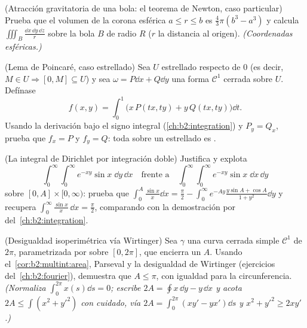 \begin{exercise}[$\star\star$]\label{exo:b2:multint:7}
(Atracción gravitatoria de una bola: el teorema de Newton, caso
particular) Prueba que el volumen de la corona esférica $a \leq r
\leq b$ es $\frac43\pi(b^3 - a^3)$ y calcula $\iiint_{B} \frac{\dd
x\,\dd y\,\dd z}{r}$ sobre la bola $B$ de radio $R$ ($r$ la distancia
al origen). \emph{(Coordenadas esféricas.)}
\end{exercise}

\begin{exercise}[$\star\star\star$]\label{exo:b2:multint:8}
(Lema de Poincaré, caso estrellado) Sea $U$ estrellado respecto de
$0$ (es decir, $M \in U \Rightarrow [0, M] \subseteq U$) y sea
$\omega = P\dd x + Q\dd y$ una forma $\mathcal{C}^1$ cerrada sobre
$U$. Defínase
\[
f(x, y) = \int_0^1 \bigl(x\,P(tx, ty) + y\,Q(tx, ty)\bigr)\dd t .
\]
Usando la derivación bajo el signo integral
(\cref{ch:b2:integration}) y $P_y = Q_x$, prueba que $f_x = P$ y $f_y
= Q$: toda  sobre un  estrellado es .
\end{exercise}

\begin{exercise}[$\star\star\star$]\label{exo:b2:multint:9}
(La integral de Dirichlet por integración doble) Justifica y explota
\[
\int_0^\infty\!\!\int_0^\infty e^{-xy}\sin x\;\dd y\,\dd x
\quad\text{frente a}\quad
\int_0^\infty\!\!\int_0^\infty e^{-xy}\sin x\;\dd x\,\dd y
\]
sobre $[0, A] \times [0, \infty)$: prueba que $\int_0^A \frac{\sin
x}{x}\dd x = \frac\pi2 - \int_0^\infty e^{-Ay}\frac{y\sin A + \cos
A}{1 + y^2}\dd y$ y recupera $\int_0^\infty \frac{\sin x}{x}\,\dd x =
\frac\pi2$, comparando con la demostración por  del~\cref{ch:b2:integration}.
\end{exercise}

\begin{exercise}[$\star\star\star$]\label{exo:b2:multint:10}
(Desigualdad isoperimétrica vía Wirtinger) Sea $\gamma$ una curva
cerrada simple $\mathcal{C}^1$ de  $2\pi$, parametrizada por
 sobre $[0, 2\pi]$, que encierra un  $A$. Usando
el~\cref{cor:b2:multint:area}, Parseval y la desigualdad de Wirtinger
(ejercicios del~\cref{ch:b2:fourier}), demuestra que $A \leq \pi$,
con igualdad para la circunferencia. \emph{(Normaliza
$\int_0^{2\pi} x(s)\dd s = 0$; escribe $2A = \oint x\,\dd y - y\,\dd
x$ y acota $2A \leq \int (x^2 + y'^2)$ con cuidado, vía $2A =
\int_0^{2\pi}(xy' - yx')\dd s$ y $x^2 + y'^2 \geq 2xy'$.)}
\end{exercise}


